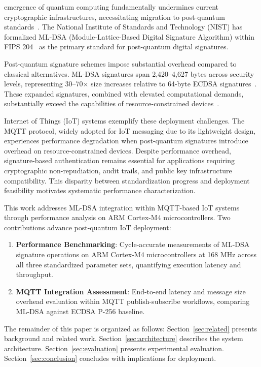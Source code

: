 \documentclass[final, twoside]{IEEEtran} %
\begin{document}
 emergence of quantum computing fundamentally undermines current cryptographic infrastructures, necessitating migration to post-quantum standards~\cite{Khalid2019}. The National Institute of Standards and Technology (NIST) has formalized ML-DSA (Module-Lattice-Based Digital Signature Algorithm) within FIPS 204~\cite{NIST-FIPS-204} as the primary standard for post-quantum digital signatures.

\IEEEpubidadjcol

Post-quantum signature schemes impose substantial overhead compared to classical alternatives. ML-DSA signatures span 2,420--4,627 bytes across security levels, representing 30--70$\times$ size increases relative to 64-byte ECDSA signatures~\cite{HwangKim2024}. These expanded signatures, combined with elevated computational demands, substantially exceed the capabilities of resource-constrained devices~\cite{Ghosh2019}.

Internet of Things (IoT) systems exemplify these deployment challenges. The MQTT protocol, widely adopted for IoT messaging due to its lightweight design, experiences performance degradation when post-quantum signatures introduce overhead on resource-constrained devices. Despite performance overhead, signature-based authentication remains essential for applications requiring cryptographic non-repudiation, audit trails, and public key infrastructure compatibility. This disparity between standardization progress and deployment feasibility motivates systematic performance characterization.

This work addresses ML-DSA integration within MQTT-based IoT systems through performance analysis on ARM Cortex-M4 microcontrollers. Two contributions advance post-quantum IoT deployment:

\begin{enumerate}
	\item \textbf{Performance Benchmarking}: Cycle-accurate measurements of ML-DSA signature operations on ARM Cortex-M4 microcontrollers at 168 MHz across all three standardized parameter sets, quantifying execution latency and throughput.

	\item \textbf{MQTT Integration Assessment}: End-to-end latency and message size overhead evaluation within MQTT publish-subscribe workflows, comparing ML-DSA against ECDSA P-256 baseline.
\end{enumerate}

The remainder of this paper is organized as follows: Section~\ref{sec:related} presents background and related work. Section~\ref{sec:architecture} describes the system architecture. Section~\ref{sec:evaluation} presents experimental evaluation. Section~\ref{sec:conclusion} concludes with implications for deployment.
\end{document}
